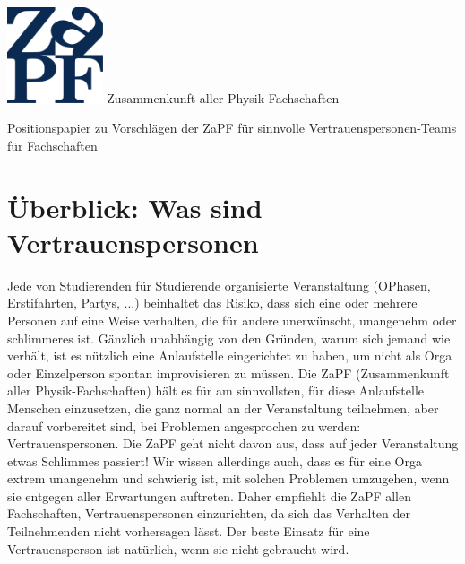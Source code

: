 \documentclass[DIV=calc]{scrartcl}
\begin{document}
  \hspace{0.87\textwidth}
  \begin{minipage}{120pt}
  	\vspace{-1.8cm}
  	\includegraphics[width=80pt]{../logo.pdf}
  	\centering
  	\small Zusammenkunft aller Physik-Fachschaften
  \end{minipage}
  \begin{center}
    \huge{Positionspapier zu Vorschlägen der ZaPF für sinnvolle Vertrauenspersonen-Teams für Fachschaften}\vspace{.25\baselineskip}\\
  	\normalsize
  \end{center}
  \vspace{1cm}

  \tableofcontents

\section{Überblick: Was sind Vertrauenspersonen}
Jede von Studierenden für Studierende organisierte Veranstaltung (OPhasen, Erstifahrten, Partys, ...) beinhaltet das Risiko, dass sich eine oder mehrere Personen auf eine Weise verhalten, die für andere unerwünscht, unangenehm oder schlimmeres ist. Gänzlich unabhängig von den Gründen, warum sich jemand wie verhält, ist es nützlich eine Anlaufstelle eingerichtet zu haben, um nicht als Orga oder Einzelperson spontan improvisieren zu müssen. Die ZaPF (Zusammenkunft aller Physik-Fachschaften) hält es für am sinnvollsten,  für diese Anlaufstelle Menschen einzusetzen, die ganz normal an der Veranstaltung teilnehmen, aber darauf vorbereitet sind, bei Problemen angesprochen zu werden: Vertrauenspersonen. 
Die ZaPF geht nicht davon aus, dass auf jeder Veranstaltung etwas Schlimmes passiert! Wir wissen allerdings auch, dass es für eine Orga extrem unangenehm und schwierig ist, mit solchen Problemen umzugehen, wenn sie entgegen aller Erwartungen auftreten. Daher empfiehlt die ZaPF allen Fachschaften, Vertrauenspersonen einzurichten, da sich das Verhalten der Teilnehmenden nicht vorhersagen lässt. Der beste Einsatz für eine Vertrauensperson ist natürlich, wenn sie nicht gebraucht wird. 
\end{document}
